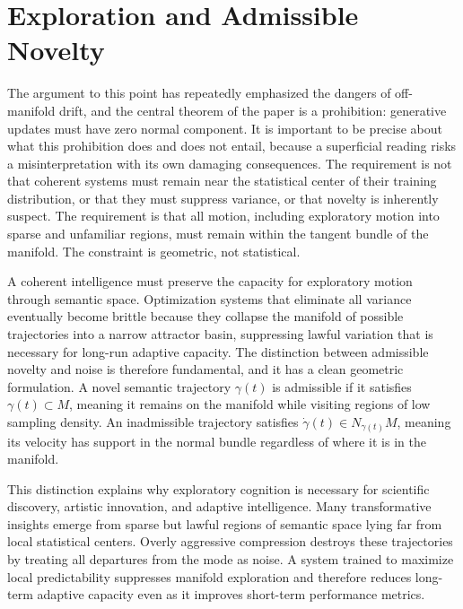 \documentclass[11pt,a4paper,twocolumn]{article}
\begin{document}

\section{Exploration and Admissible Novelty}

The argument to this point has repeatedly emphasized the
dangers of off-manifold drift, and the central theorem of
the paper is a prohibition: generative updates must have
zero normal component. It is important to be precise about
what this prohibition does and does not entail, because a
superficial reading risks a misinterpretation with its own
damaging consequences. The requirement is not that coherent
systems must remain near the statistical center of their
training distribution, or that they must suppress variance,
or that novelty is inherently suspect. The requirement is
that all motion, including exploratory motion into sparse
and unfamiliar regions, must remain within the tangent
bundle of the manifold. The constraint is geometric, not
statistical.

A coherent intelligence must preserve the capacity for
exploratory motion through semantic space. Optimization
systems that eliminate all variance eventually become brittle
because they collapse the manifold of possible trajectories
into a narrow attractor basin, suppressing lawful variation
that is necessary for long-run adaptive capacity. The
distinction between admissible novelty and noise is
therefore fundamental, and it has a clean geometric
formulation. A novel semantic trajectory $\gamma(t)$ is
admissible if it satisfies $\gamma(t) \subset M$, meaning
it remains on the manifold while visiting regions of low
sampling density. An inadmissible trajectory satisfies
$\dot{\gamma}(t) \in N_{\gamma(t)}M$, meaning its velocity
has support in the normal bundle regardless of where it is
in the manifold.

This distinction explains why exploratory cognition is
necessary for scientific discovery, artistic innovation,
and adaptive intelligence. Many transformative insights
emerge from sparse but lawful regions of semantic space
lying far from local statistical centers. Overly aggressive
compression destroys these trajectories by treating all
departures from the mode as noise. A system trained to
maximize local predictability suppresses manifold exploration
and therefore reduces long-term adaptive capacity even as
it improves short-term performance metrics.
\end{document}
